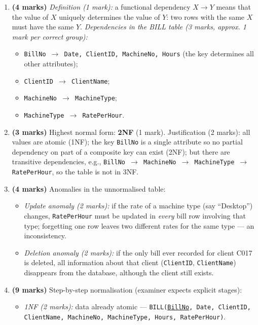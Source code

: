 \documentclass[11pt]{article}
\begin{document}
\begin{corrige}
\begin{enumerate}
\item \textbf{(4 marks)} \emph{Definition (1 mark):} a functional dependency $X \rightarrow Y$ means that the value of $X$ uniquely determines the value of $Y$: two rows with the same $X$ must have the same $Y$. \emph{Dependencies in the BILL table (3 marks, approx. 1 mark per correct group):}
\begin{itemize}
\item \texttt{BillNo $\rightarrow$ Date, ClientID, MachineNo, Hours} (the key determines all other attributes);
\item \texttt{ClientID $\rightarrow$ ClientName};
\item \texttt{MachineNo $\rightarrow$ MachineType};
\item \texttt{MachineType $\rightarrow$ RatePerHour}.
\end{itemize}
\item \textbf{(3 marks)} Highest normal form: \textbf{2NF} (1 mark). Justification (2 marks): all values are atomic (1NF); the key \texttt{BillNo} is a single attribute so no partial dependency on part of a composite key can exist (2NF); but there are transitive dependencies, e.g., \texttt{BillNo $\rightarrow$ MachineNo $\rightarrow$ MachineType $\rightarrow$ RatePerHour}, so the table is not in 3NF.
\item \textbf{(4 marks)} Anomalies in the unnormalised table:
\begin{itemize}
\item \emph{Update anomaly (2 marks):} if the rate of a machine type (say ``Desktop'') changes, \texttt{RatePerHour} must be updated in \emph{every} bill row involving that type; forgetting one row leaves two different rates for the same type — an inconsistency.
\item \emph{Deletion anomaly (2 marks):} if the only bill ever recorded for client C017 is deleted, all information about that client (\texttt{ClientID}, \texttt{ClientName}) disappears from the database, although the client still exists.
\end{itemize}
\item \textbf{(9 marks)} Step-by-step normalisation (examiner expects explicit stages):
\begin{itemize}
\item \emph{1NF (2 marks):} data already atomic — \texttt{BILL(\underline{BillNo}, Date, ClientID, ClientName, MachineNo, MachineType, Hours, RatePerHour)}.

\end{itemize}
\end{enumerate}
\end{corrige}
\end{document}
